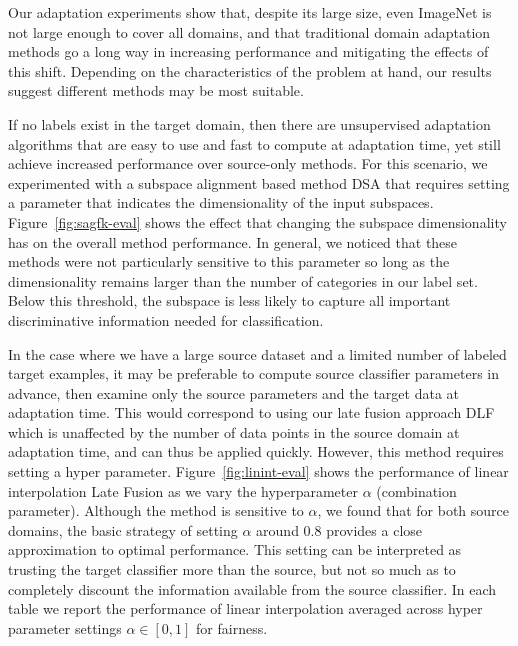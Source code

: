 Our adaptation experiments show that, despite its large size, even ImageNet is not large enough to cover all domains, and
that traditional domain adaptation methods go a long way in increasing performance and mitigating the effects of this shift.
Depending on the characteristics of the problem at hand, our results suggest different methods may be most suitable.

If no labels exist in the target domain, then there are unsupervised adaptation algorithms that are easy to use and fast to compute at adaptation time, yet still achieve increased performance over source-only methods. 
For this scenario, we experimented with a subspace alignment based method DSA that requires setting a parameter that indicates the dimensionality of the input subspaces. 
Figure~\ref{fig:sagfk-eval} shows the effect that changing the subspace dimensionality has on the overall method performance. 
In general, we noticed that these methods were not particularly sensitive to this parameter so long as the dimensionality remains larger than the number of categories in our label set.
Below this threshold, the subspace is less likely to capture all important discriminative information needed for classification.

In the case where we have a large source dataset and a limited number of labeled target examples, it may be preferable to compute source classifier parameters in advance, then examine only the source parameters and the target data at adaptation time.
This would correspond to using our late fusion approach DLF which is unaffected by the number of data points in the source domain at adaptation time, and can thus be applied quickly.
However, this method requires setting a hyper parameter. 
Figure~\ref{fig:linint-eval} shows the performance of linear interpolation Late Fusion as we vary the hyperparameter $\alpha$ (combination parameter).
Although the method is sensitive to $\alpha$, we found that for both source domains, the basic strategy of setting $\alpha$ around $0.8$ provides a close approximation to optimal performance. 
This setting can be interpreted as trusting the target classifier more than the source, but not so much as to completely discount the information available from the source classifier. In each table we report the performance of linear interpolation averaged across hyper parameter settings $\alpha \in [0,1]$ for fairness.

